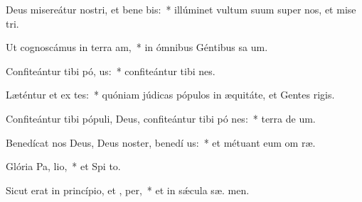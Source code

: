 \item Deus misereátur nostri, et bene bis:~* illúminet vultum suum super nos, et mise tri.
\item Ut cognoscámus in terra  am,~* in ómnibus Géntibus sa um.
\item Confiteántur tibi pó, us:~* confiteántur tibi  nes.
\item Læténtur et ex tes:~* quóniam júdicas pópulos in æquitáte, et Gentes   rigis.
\item Confiteántur tibi pópuli, Deus, confiteántur tibi pó nes:~* terra de  um.
\item Benedícat nos Deus, Deus noster, benedí  us:~* et métuant eum om  ræ.
\item Glória Pa,  lio,~* et Spi to.
\item Sicut erat in princípio, et ,  per,~* et in sǽcula sæ. men.
